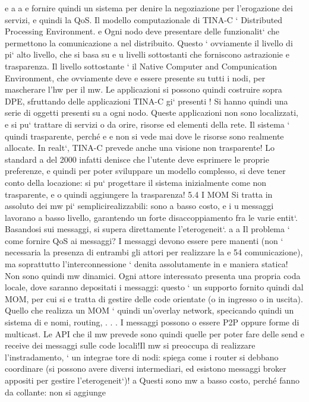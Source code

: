 \documentclass[a4paper,12pt]{article}
\begin{document}
e
a
a
e fornire quindi un sistema per denire la negoziazione per l'erogazione dei
servizi, e quindi la QoS.
Il modello computazionale di TINA-C ` Distributed Processing Environment.
e
Ogni nodo deve presentare delle funzionalit` che permettono la comunicazione
a
nel distribuito. Questo ` ovviamente il livello di pi` alto livello, che si basa su
e
u
livelli sottostanti che forniscono astrazionie e trasparenza. Il livello sottostante
` il Native Computer and Compunication Environment, che ovviamente deve
e
essere presente su tutti i nodi, per mascherare l'hw per il mw.
Le applicazioni si possono quindi costruire sopra DPE, sfruttando delle applicazioni TINA-C gi` presenti ! Si hanno
quindi una serie di oggetti presenti su
a
ogni nodo. Queste applicazioni non sono localizzati, e si pu` trattare di servizi
o
da orire, risorse ed elementi della rete. Il sistema ` quindi trasparente, perché
e
e
non si vede mai dove le risorse sono realmente allocate.
In realt`, TINA-C prevede anche una visione non trasparente! Lo standard
a
del 2000 infatti denisce che l'utente deve esprimere le proprie preferenze, e
quindi per poter sviluppare un modello complesso, si deve tener conto della
locazione: si pu` progettare il sistema inizialmente come non trasparente, e
o
quindi aggiungere la trasparenza!
5.4
I MOM
Si tratta in assoluto dei mw pi` semplicirealizzabili: sono a basso costo, e i
u
messaggi lavorano a basso livello, garantendo un forte disaccoppiamento fra le
varie entit`. Basandosi sui messaggi, si supera direttamente l'eterogeneit`.
a
a
Il problema ` come fornire QoS ai messaggi? I messaggi devono essere pere
manenti (non ` necessaria la presenza di entrambi gli attori per realizzare la
e
54
\newpage
comunicazione), ma soprattutto l'interconnessione ` denita assolutamente in
e
maniera statica! Non sono quindi mw dinamici.
Ogni attore interessato presenta una propria coda locale, dove saranno depositati i messaggi: questo ` un supporto
fornito quindi dal MOM, per cui si
e
tratta di gestire delle code orientate (o in ingresso o in uscita). Quello che realizza un MOM ` quindi un'overlay
network, specicando quindi un sistema di
e
nomi, routing, . . .
I messaggi possono o essere P2P oppure forme di multicast. Le API che il
mw prevede sono quindi quelle per poter fare delle send e receive dei messaggi
sulle code locali!Il mw si preoccupa di realizzare l'instradamento, ` un integrae
tore di nodi: spiega come i router si debbano coordinare (si possono avere diversi
intermediari, ed esistono messaggi broker appositi per gestire l'eterogeneit`)!
a
Questi sono mw a basso costo, perché fanno da collante: non si aggiunge
\end{document}
